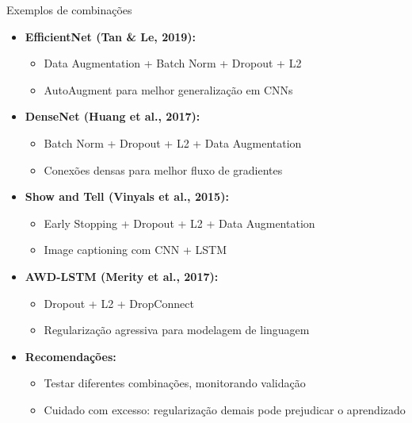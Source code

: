 \documentclass{beamer}
\begin{document}
\begin{frame}{Exemplos de combinações}
\scriptsize
\begin{itemize}
  \item \textbf{EfficientNet (Tan \& Le, 2019):}
  \begin{itemize}
    \item Data Augmentation + Batch Norm + Dropout + L2
    \item AutoAugment para melhor generalização em CNNs
  \end{itemize}
  
  \item \textbf{DenseNet (Huang et al., 2017):}
  \begin{itemize}
    \item Batch Norm + Dropout + L2 + Data Augmentation
    \item Conexões densas para melhor fluxo de gradientes
  \end{itemize}
  
  \item \textbf{Show and Tell (Vinyals et al., 2015):}
  \begin{itemize}
    \item Early Stopping + Dropout + L2 + Data Augmentation
    \item Image captioning com CNN + LSTM
  \end{itemize}
  
  \item \textbf{AWD-LSTM (Merity et al., 2017):}
  \begin{itemize}
    \item Dropout + L2 + DropConnect
    \item Regularização agressiva para modelagem de linguagem
  \end{itemize}
   \item \textbf{Recomendações:}
  \begin{itemize}
    \item Testar diferentes combinações, monitorando validação
    \item Cuidado com excesso: regularização demais pode prejudicar o aprendizado
  \end{itemize}
\end{itemize}
\end{frame}
\end{document}
